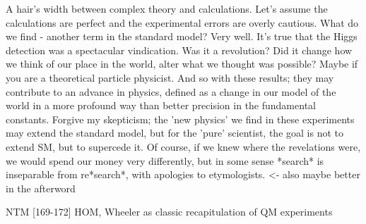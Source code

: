 	A hair's width between complex theory and calculations.
	Let's assume the calculations are perfect and the experimental errors are overly cautious.
	What do we find - another term in the standard model? Very well.
	It's true that the Higgs detection was a spectacular vindication.
	Was it a revolution? Did it change how we think of our place in the world, alter what we thought was possible? Maybe if you are a theoretical particle physicist.
	And so with these results; they may contribute to an advance in physics, defined as a change in our model of the world in a more profound way than better precision in the fundamental constants.
	Forgive my skepticism; the 'new physics' we find in these experiments may extend the standard model, but for the 'pure' scientist, the goal is not to extend SM, but to supercede it.
	Of course, if we knew where the revelations were, we would spend our money very differently, but in some sense *search* is inseparable from re*search*, with apologies to etymologists.
	 <- also maybe better in the afterword


			NTM [169-172] HOM, Wheeler as classic recapitulation of QM experiments 



